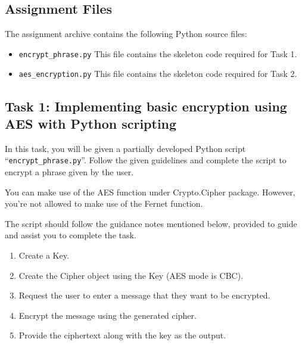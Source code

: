 \documentclass[11pt,letterpaper]{article}
\begin{document}
\subsection*{Assignment Files}
The assignment archive contains the following Python source files:

\begin{itemize}[nolistsep]
	\item \texttt{encrypt\_phrase.py} This file contains the skeleton code required for Task 1.
	\item \texttt{aes\_encryption.py} This file contains the skeleton code required for Task 2.\\
\end{itemize}

\subsection*{Task 1: Implementing basic encryption using AES with Python scripting}

In this task, you will be given a partially developed Python script ``\texttt{encrypt\_phrase.py}''. Follow the given guidelines and complete the script to encrypt a phrase given by the user.

\medskip
\noindent You can make use of the AES function under Crypto.Cipher package. However, you're not allowed to make use of the Fernet function.

\medskip
\noindent The script should follow the guidance notes mentioned below, provided to guide and assist you to complete the task. 

\begin{enumerate}
    \item Create a Key.
    \item Create the Cipher object using the Key (AES mode is CBC).
    \item Request the user to enter a message that they want to be encrypted.
    \item Encrypt the message using the generated cipher.
    \item Provide the ciphertext along with the key as the output.
\end{enumerate}
\end{document}
